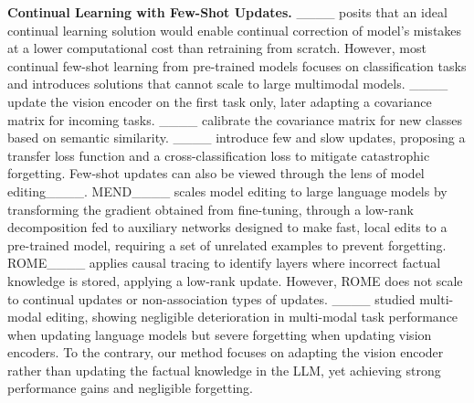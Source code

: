 \textbf{Continual Learning with Few-Shot Updates.} ____ posits that an ideal continual learning solution would enable continual correction of model's mistakes at a lower computational cost than retraining from scratch. However, most continual few-shot learning from pre-trained models focuses on classification tasks and introduces solutions that cannot scale to large multimodal models. ____ update the vision encoder on the first task only, later adapting a covariance matrix for incoming tasks. ____ calibrate the covariance matrix for new classes based on semantic similarity. ____ introduce few and slow updates, proposing a transfer loss function and a cross-classification loss to mitigate catastrophic forgetting. Few-shot updates can also be viewed through the lens of model editing____. MEND____ scales model editing to large language models by transforming the gradient obtained from fine-tuning, through a low-rank decomposition fed to auxiliary networks designed to make fast, local edits to a pre-trained model, requiring a set of unrelated examples to prevent forgetting. ROME____ applies causal tracing to identify layers where incorrect factual knowledge is stored, applying a low-rank update. However, ROME does not scale to continual updates or non-association types of updates. ____ studied multi-modal editing, showing negligible deterioration in multi-modal task performance when updating language models but severe forgetting when updating vision encoders. To the contrary, our method focuses on adapting the vision encoder rather than updating the factual knowledge in the LLM, yet achieving strong performance gains and negligible forgetting.

